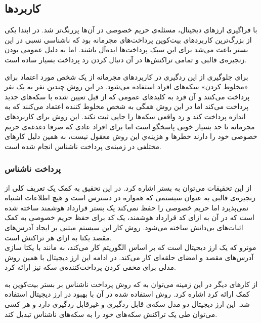 \subsection{کاربرد‌ها}
با فراگیری ارز‌های دیجیتال، مسئله‌ی حریم خصوصی در آن‌ها پررنگ‌تر شد. در ابتدا یکی از بزرگ‌ترین کاربردهای بیت‌کوین پرداخت‌های مجرمانه بود که ناشناسی نسبی در این بستر باعث می‌شد برای این سبک‌ پرداخت‌ها ایده‌آل باشند. اما به دلیل عمومی بودن زنجیره‌ی قالبی و تمامی تراکنش‌ها در آن دنبال کردن رد پرداخت بسیار ساده است.
\par
 برای جلوگیری از این ردگیری در کاربردهای مجرمانه از یک شخص مورد اعتماد برای «مخلوط کردن» سکه‌های افراد استفاده می‌شود. در این روش چندین نفر به یک نفر پرداخت می‌کنند و آن فرد به کلید‌های عمومی که از قبل تعیین شده با سکه‌های جدید پرداخت می‌کند اما در این روش همگی به شخص مخلوط کننده اعتماد می‌کنند که به اندازه پرداخت کند و رد واقعی سکه‌ها را جایی ثبت نکند. این روش برای کاربردهای مجرمانه تا حد بسیار خوبی پاسخگو است اما برای افراد عادی که صرفا دغدغه‌ی حریم خصوصی خود را دارند خطرها و هزینه‌ي این روش معقول نیست، به همین دلیل کارهای مختلفی در زمینه‌ی پرداخت ناشناس انجام شده است. 
 
\subsubsection{پرداخت ناشناس}
از این تحقیقات می‌توان به بستر 
\cite{hawk}
اشاره کرد. در این تحقیق به کمک یک تعریف کلی از زنجیره‌ی قالبی به عنوان سیستمی که همواره در دسترس است و هیچ اطلاعات اشتباه نمی‌پذیرد اما حریم خصوصی را حفظ نمی‌کند یک بستر قرارداد هوشمند ساخته شده است که در آن به ازای کد قرارداد هوشمند، یک کد برای حفظ حریم خصوصی به کمک اثبات‌های بی‌دانش ساخته می‌شود. روش کار این سیستم مبتنی بر ایجاد آدرس‌های مقصد یکتا به ازای هر تراکنش است. 
\\
مونرو 
که یک ارز دیجیتال است که بر اساس الگوریتم 
\cite{monero}
کار می‌کند، به مانند 
با یکتا سازی آدرس‌های مقصد و امضای حلقه‌ای 
کار می‌کند. در ادامه این ارز دیجیتال با همین روش مدلی 
\cite{monero2}
برای مخفی کردن پرداخت‌کننده‌ی سکه نیز ارائه کرد.
\par
از کارهای دیگر در این زمینه‌ می‌توان به 
\cite{zerocoin}
که روش پرداخت ناشناس بر بستر بیت‌کوین به کمک 
ارائه کرد اشاره کرد. روش استفاده شده در آن با بهبود در ارز دیجیتال 
\cite{zerocash}
استفاده شد. این ارز دیجیتال دو مدل سکه‌ی قابل ردگیری و غیرقابل ردگیری دارد و هر کسی می‌توان طی یک تراکنش سکه‌های خود را به سکه‌های ناشناس تبدیل کند.



